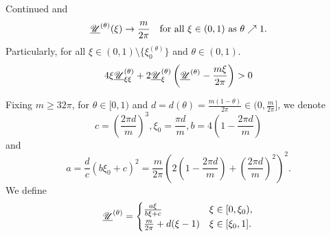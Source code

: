 \begin{frame}

\begin{block}{Continued}
	and
	\begin{equation}\label{eq:uut pp converges to m/2pi}
		\underline{\mathscr U}^{(\theta)} (\xi) \rightarrow \frac{m}{2\pi} \quad\text{for all } \xi\in(0, 1) \text{ as } \theta\nearrow 1.
	\end{equation}
	Particularly, for all  $\xi\in (0, 1)\setminus \{ \xi_0^{(\theta)}\}$ and $\theta\in(0,1)$.
	\begin{equation}\label{eq:stationary subsolution inequality}
		4\xi\underline{\mathscr U}^{(\theta)}_{\xi\xi} + 2\underline{\mathscr U}^{(\theta)}_\xi\left(\underline{\mathscr U}^{(\theta)} -\frac{m\xi}{2\pi}\right) > 0
	\end{equation}
\end{block}

	Fixing $m\geqslant32\pi$, for $\theta\in[0,1)$ and $d=d(\theta)=\frac{m(1-\theta)}{2\pi}\in(0,\frac{m}{2\pi}]$, we denote
	\begin{equation}\label{parameter c b s}
	c = \left(\frac{2\pi d}m\right)^3, \xi_0 = \frac{\pi d}m, b = 4\left(1 - \frac{2\pi d}m\right)
	\end{equation}
	 and
	\begin{equation}\label{parameter a}
		a= \frac{d}{c}(b\xi_0 + c)^2 = \frac{m}{2\pi}\left(2\left(1-\frac{2\pi d}m\right) + \left(\frac{2\pi d}m\right)^2\right)^2.
	\end{equation}
We define
	\begin{equation}\label{eq: subsolution with parameter}
		\underline{\mathscr U}^{(\theta)} =
		\begin{cases}
			\frac{a\xi}{b\xi + c} & \xi\in[0, \xi_0),\\
			\frac{m}{2\pi} + d(\xi - 1) & \xi\in[\xi_0, 1].\\
		\end{cases}
	\end{equation}
\end{frame}

